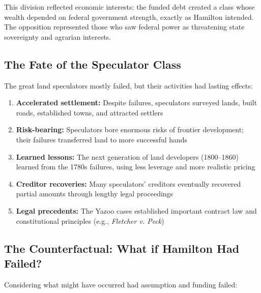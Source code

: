 \documentclass[12pt]{article}
\begin{document}
This division reflected economic interests: the funded debt created a class whose wealth depended on federal government strength, exactly as Hamilton intended. The opposition represented those who saw federal power as threatening state sovereignty and agrarian interests.

\subsection{The Fate of the Speculator Class}

The great land speculators mostly failed, but their activities had lasting effects:

\begin{enumerate}
\item \textbf{Accelerated settlement:} Despite failures, speculators surveyed lands, built roads, established towns, and attracted settlers

\item \textbf{Risk-bearing:} Speculators bore enormous risks of frontier development; their failures transferred land to more successful hands

\item \textbf{Learned lessons:} The next generation of land developers (1800--1860) learned from the 1780s failures, using less leverage and more realistic pricing

\item \textbf{Creditor recoveries:} Many speculators' creditors eventually recovered partial amounts through lengthy legal proceedings

\item \textbf{Legal precedents:} The Yazoo cases established important contract law and constitutional principles (e.g., \textit{Fletcher v. Peck})
\end{enumerate}

\subsection{The Counterfactual: What if Hamilton Had Failed?}

Considering what might have occurred had assumption and funding failed:
\end{document}
